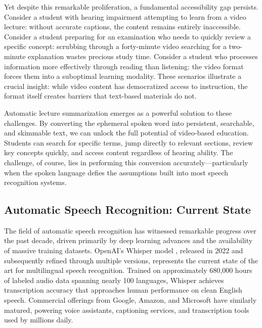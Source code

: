 Yet despite this remarkable proliferation, a fundamental accessibility gap persists. Consider a student with hearing impairment attempting to learn from a video lecture: without accurate captions, the content remains entirely inaccessible. Consider a student preparing for an examination who needs to quickly review a specific concept: scrubbing through a forty-minute video searching for a two-minute explanation wastes precious study time. Consider a student who processes information more effectively through reading than listening: the video format forces them into a suboptimal learning modality. These scenarios illustrate a crucial insight: while video content has democratized access to instruction, the format itself creates barriers that text-based materials do not.

Automatic lecture summarization emerges as a powerful solution to these challenges. By converting the ephemeral spoken word into persistent, searchable, and skimmable text, we can unlock the full potential of video-based education. Students can search for specific terms, jump directly to relevant sections, review key concepts quickly, and access content regardless of hearing ability. The challenge, of course, lies in performing this conversion accurately---particularly when the spoken language defies the assumptions built into most speech recognition systems.

\subsection{Automatic Speech Recognition: Current State}

The field of automatic speech recognition has witnessed remarkable progress over the past decade, driven primarily by deep learning advances and the availability of massive training datasets. OpenAI's Whisper model \cite{Radford2023}, released in 2022 and subsequently refined through multiple versions, represents the current state of the art for multilingual speech recognition. Trained on approximately 680,000 hours of labeled audio data spanning nearly 100 languages, Whisper achieves transcription accuracy that approaches human performance on clean English speech. Commercial offerings from Google, Amazon, and Microsoft have similarly matured, powering voice assistants, captioning services, and transcription tools used by millions daily.

